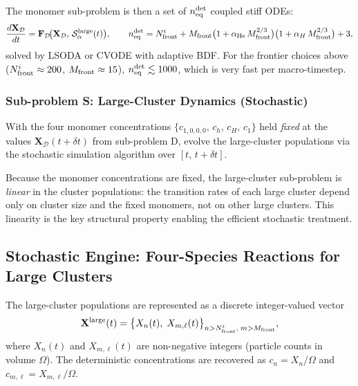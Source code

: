 \documentclass[pdflatex,sn-basic]{sn-jnl} %
\begin{document}
The monomer sub-problem is then a set of
$n_{\rm eq}^{\rm det}$ coupled stiff ODEs:
\begin{equation}\label{eq:subD_system}
    \frac{d\mathbf{X}_{\mathcal{D}}}{dt}
    = \mathbf{F}_{\mathcal{D}}\!\bigl(
        \mathbf{X}_{\mathcal{D}},\,
        \mathcal{S}_\alpha^{\rm large}(t)
      \bigr),
    \qquad
    n_{\rm eq}^{\rm det}
    = N_{\rm front}^i
    + M_{\rm front}\bigl(1 + \alpha_{\rm He}\,M_{\rm front}^{2/3}\bigr)
      \bigl(1 + \alpha_H\,M_{\rm front}^{2/3}\bigr)
    + 3,
\end{equation}
solved by LSODA or CVODE with adaptive BDF.  For the frontier choices
above ($N_{\rm front}^i \approx 200$, $M_{\rm front} \approx 15$),
$n_{\rm eq}^{\rm det} \lesssim 1000$, which is very fast per
macro-timestep.

\subsubsection{Sub-problem S: Large-Cluster Dynamics (Stochastic)}
\label{sec:subS}

With the four monomer concentrations
$\{c_{1,0,0,0},\,c_h,\,c_H,\,c_1\}$ held \emph{fixed} at the values
$\mathbf{X}_{\mathcal{D}}(t+\delta t)$ from sub-problem D, evolve
the large-cluster populations via the stochastic simulation
algorithm over $[t,\, t+\delta t]$.

Because the monomer concentrations are fixed, the large-cluster
sub-problem is \emph{linear} in the cluster populations: the
transition rates of each large cluster depend only on cluster size
and the fixed monomers, not on other large clusters.  This
linearity is the key structural property enabling the efficient
stochastic treatment.

\subsection{Stochastic Engine: Four-Species Reactions for Large Clusters}
\label{sec:hybrid_SSA}

The large-cluster populations are represented as a discrete
integer-valued vector
\begin{equation}\label{eq:stoch_pop}
    \mathbf{X}^{\rm large}(t)
    = \bigl\{
        X_{n}(t),\; X_{m,\ell}(t)
      \bigr\}_{n > N_{\rm front}^i,\; m > M_{\rm front}},
\end{equation}
where $X_n(t)$ and $X_{m,\ell}(t)$ are non-negative integers
(particle counts in volume $\Omega$).  The deterministic
concentrations are recovered as $c_n = X_n / \Omega$ and
$c_{m,\ell} = X_{m,\ell} / \Omega$.
\end{document}
